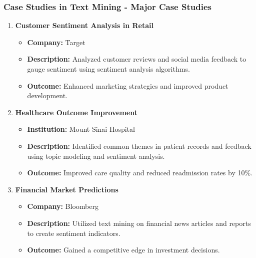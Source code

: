 \documentclass[aspectratio=169]{beamer}
\begin{document}
\begin{frame}[fragile]
  \frametitle{Case Studies in Text Mining - Major Case Studies}
  \begin{enumerate}
    \item \textbf{Customer Sentiment Analysis in Retail}
      \begin{itemize}
        \item \textbf{Company:} Target
        \item \textbf{Description:} Analyzed customer reviews and social media feedback to gauge sentiment using sentiment analysis algorithms.
        \item \textbf{Outcome:} Enhanced marketing strategies and improved product development.
      \end{itemize}

    \item \textbf{Healthcare Outcome Improvement}
      \begin{itemize}
        \item \textbf{Institution:} Mount Sinai Hospital
        \item \textbf{Description:} Identified common themes in patient records and feedback using topic modeling and sentiment analysis.
        \item \textbf{Outcome:} Improved care quality and reduced readmission rates by 10\%.
      \end{itemize}

    \item \textbf{Financial Market Predictions}
      \begin{itemize}
        \item \textbf{Company:} Bloomberg
        \item \textbf{Description:} Utilized text mining on financial news articles and reports to create sentiment indicators.
        \item \textbf{Outcome:} Gained a competitive edge in investment decisions.
      \end{itemize}
  \end{enumerate}
\end{frame}
\end{document}
